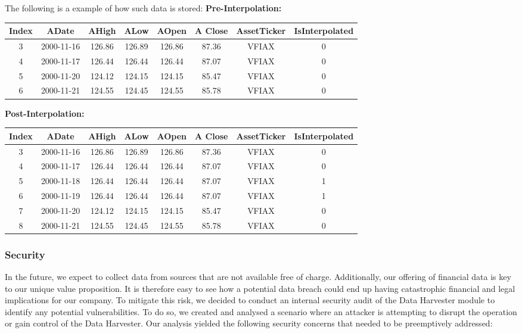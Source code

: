 \documentclass[main.tex]{subfiles}
\begin{document}
The following is a example of how such data is stored:
\textbf{\newline Pre-Interpolation: }
\begin{center}
    \begin{tabular}{||c c c c c c c c||} 
        \hline
        Index & ADate & AHigh & ALow & AOpen &A Close&AssetTicker&IsInterpolated\\ [0.5ex] 
        \hline\hline
        3&2000-11-16&126.86&126.89&126.86&87.36&VFIAX&0 \\ 
        \hline
        4&2000-11-17&126.44&126.44&126.44&87.07&VFIAX&0\\
        \hline
        5&2000-11-20&124.12&124.15&124.15&85.47&VFIAX&0\\ 
        \hline
        6&2000-11-21&124.55&124.45&124.55&85.78&VFIAX&0\\
        \hline
    \end{tabular}
\end{center}

\textbf{\newline Post-Interpolation: }
\begin{center}
    \begin{tabular}{||c c c c c c c c||} 
        \hline
        Index & ADate & AHigh & ALow & AOpen &A Close&AssetTicker&IsInterpolated\\ [0.5ex] 
        \hline\hline
        3&2000-11-16&126.86&126.89&126.86&87.36&VFIAX&0 \\ 
        \hline
        4&2000-11-17&126.44&126.44&126.44&87.07&VFIAX&0\\
        \hline
        5&2000-11-18&126.44&126.44&126.44&87.07&VFIAX&1
        \\
        \hline
        6&2000-11-19&126.44&126.44&126.44&87.07&VFIAX&1 \\
        \hline
        7&2000-11-20&124.12&124.15&124.15&85.47&VFIAX&0\\ 
        \hline
        8&2000-11-21&124.55&124.45&124.55&85.78&VFIAX&0\\
        \hline
    \end{tabular}
\end{center}

\subsubsection{Security}
In the future, we expect to collect data from sources that are not available free of charge. Additionally, our offering of financial data is key to our unique value proposition. It is therefore easy to see how a potential data breach could end up having catastrophic financial and legal implications for our company. To mitigate this risk, we decided to conduct an internal security audit of the Data Harvester module to identify any potential vulnerabilities. To do so, we created and analysed a scenario where an attacker is attempting to disrupt the operation or gain control of the Data Harvester. Our analysis yielded the following security concerns that needed to be preemptively addressed:
\end{document}
